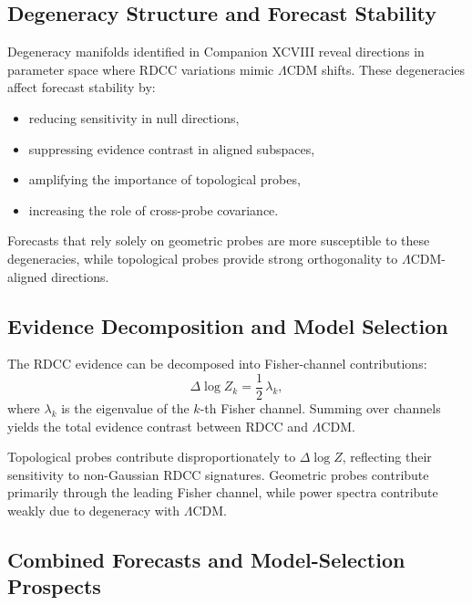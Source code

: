 \documentclass[11pt,a4paper]{article}
\begin{document}
\subsection{Degeneracy Structure and Forecast Stability}

Degeneracy manifolds identified in Companion XCVIII reveal directions in
parameter space where RDCC variations mimic $\Lambda$CDM shifts. These
degeneracies affect forecast stability by:

\begin{itemize}
    \item reducing sensitivity in null directions,
    \item suppressing evidence contrast in aligned subspaces,
    \item amplifying the importance of topological probes,
    \item increasing the role of cross-probe covariance.
\end{itemize}

Forecasts that rely solely on geometric probes are more susceptible to these
degeneracies, while topological probes provide strong orthogonality to
$\Lambda$CDM-aligned directions.

\subsection{Evidence Decomposition and Model Selection}

The RDCC evidence can be decomposed into Fisher-channel contributions:
\begin{equation}
    \Delta \log Z_{k}
    =
    \frac{1}{2}\,\lambda_{k},
\end{equation}
where $\lambda_{k}$ is the eigenvalue of the $k$-th Fisher channel. Summing over
channels yields the total evidence contrast between RDCC and $\Lambda$CDM.

Topological probes contribute disproportionately to $\Delta \log Z$, reflecting
their sensitivity to non-Gaussian RDCC signatures. Geometric probes contribute
primarily through the leading Fisher channel, while power spectra contribute
weakly due to degeneracy with $\Lambda$CDM.

\subsection{Combined Forecasts and Model-Selection Prospects}
\end{document}
